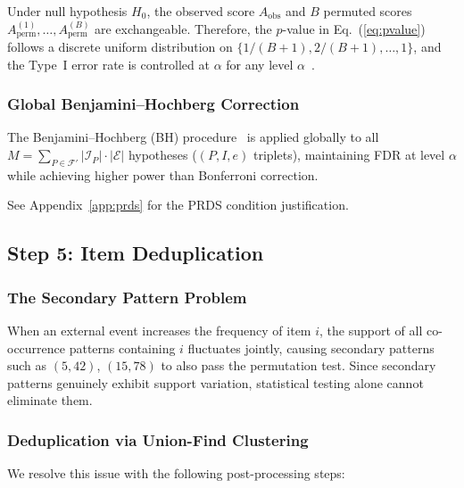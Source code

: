 \begin{proposition}\label{prop:perm_exact}
Under null hypothesis $H_0$, the observed score $A_{\text{obs}}$ and
$B$ permuted scores $A_{\text{perm}}^{(1)}, \ldots, A_{\text{perm}}^{(B)}$ are exchangeable.
Therefore, the $p$-value in Eq.~(\ref{eq:pvalue}) follows a discrete uniform distribution
on $\{1/(B+1), 2/(B+1), \ldots, 1\}$,
and the Type~I error rate is controlled at $\alpha$ for any level $\alpha$~\cite{davison1997bootstrap}.
\end{proposition}

\subsubsection{Global Benjamini--Hochberg Correction}

The Benjamini--Hochberg (BH) procedure~\cite{benjamini1995controlling}
is applied globally to all
$M = \sum_{P \in \mathcal{F}'} |\mathcal{I}_P| \cdot |\mathcal{E}|$
hypotheses ($(P, I, e)$ triplets),
maintaining FDR at level $\alpha$ while achieving higher power than Bonferroni correction.

See Appendix~\ref{app:prds} for the PRDS condition justification.

\subsection{Step 5: Item Deduplication}\label{sec:dedup}



\subsubsection{The Secondary Pattern Problem}

When an external event increases the frequency of item $i$,
the support of all co-occurrence patterns containing $i$ fluctuates jointly,
causing secondary patterns such as $(5, 42)$, $(15, 78)$
to also pass the permutation test.
Since secondary patterns genuinely exhibit support variation,
statistical testing alone cannot eliminate them.

\subsubsection{Deduplication via Union-Find Clustering}

We resolve this issue with the following post-processing steps:

